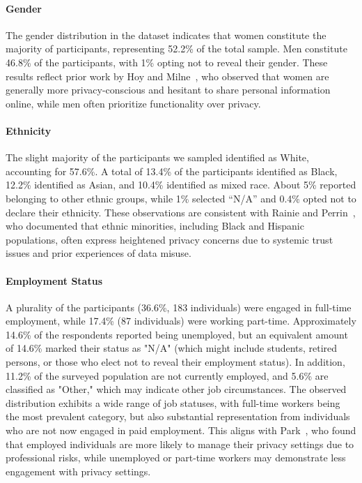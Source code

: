 \paragraph{Gender}
The gender distribution in the dataset indicates that women constitute the majority of participants, representing 52.2\% of the total sample. 
Men constitute 46.8\% of the participants, with 1\% opting not to reveal their gender. These results reflect prior work by Hoy and Milne~\cite{hoy2010gender}, who observed that women are generally more privacy-conscious and hesitant to share personal information online, while men often prioritize functionality over privacy.


\paragraph{Ethnicity}
The slight majority of the participants we sampled identified as White, accounting for 57.6\%.
A total of 13.4\% of the participants identified as Black, 12.2\% identified as Asian, and 10.4\% identified as mixed race.
About 5\% reported belonging to other ethnic groups, while 1\% selected ``N/A'' and 0.4\% opted not to declare their ethnicity. These observations are consistent with Rainie and Perrin~\cite{auxier2019americans}, who documented that ethnic minorities, including Black and Hispanic populations, often express heightened privacy concerns due to systemic trust issues and prior experiences of data misuse.



\paragraph{Employment Status}
A plurality of the participants (36.6\%, 183 individuals) were engaged in full-time employment, while 17.4\% (87 individuals) were working part-time.
Approximately 14.6\% of the respondents reported being unemployed, but an equivalent amount of 14.6\% marked their status as "N/A" (which might include students, retired persons, or those who elect not to reveal their employment status). In addition, 11.2\% of the surveyed population are not currently employed, and 5.6\% are classified as "Other," which may indicate other job circumstances. The observed distribution exhibits a wide range of job statuses, with full-time workers being the most prevalent category, but also substantial representation from individuals who are not now engaged in paid employment. This aligns with Park~\cite{park2014employee}, who found that employed individuals are more likely to manage their privacy settings due to professional risks, while unemployed or part-time workers may demonstrate less engagement with privacy settings.

